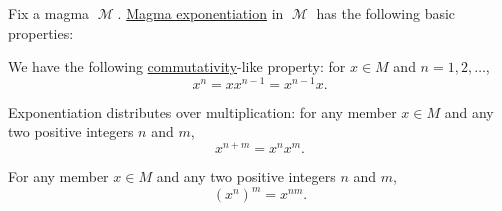 \begin{proposition}\label{thm:magma_exponentiation_properties}
  Fix a magma \( \mscrM \). \hyperref[def:magma/exponentiation]{Magma exponentiation} in \( \mscrM \) has the following basic properties:

  \begin{thmenum}
     We have the following \hyperref[def:magma/commutative]{commutativity}-like property: for \( x \in M \) and \( n = 1, 2, \ldots \),
    \begin{equation}\label{eq:thm:magma_exponentiation_properties/commutativity}
      x^n = x x^{n-1} = x^{n-1} x.
    \end{equation}

     Exponentiation distributes over multiplication: for any member \( x \in M \) and any two positive integers \( n \) and \( m \),
    \begin{equation}\label{eq:thm:magma_exponentiation_properties/multiplication}
      x^{n + m} = x^n x^m.
    \end{equation}

     For any member \( x \in M \) and any two positive integers \( n \) and \( m \),
    \begin{equation}\label{eq:thm:magma_exponentiation_properties/repeated}
      (x^n)^m = x^{nm}.
    \end{equation}
  \end{thmenum}
\end{proposition}
